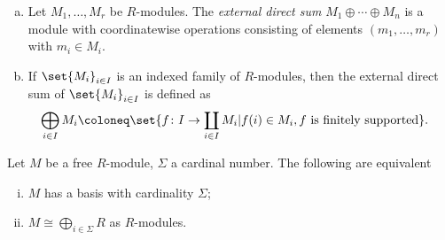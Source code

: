 \documentclass[10pt]{mypackage}
\begin{document}
\begin{definition}\hfill
  \begin{enumerate}[(a)]
    \item Let $M_1,\dots,M_r$ be $R$-modules. The \textit{external direct sum} $M_1\oplus\cdots\oplus M_n$ is a module with coordinatewise operations consisting of elements $\left( m_1,\dots,m_r \right)$ with $m_i\in M_i$.
    \item If $\set{M_i}_{i\in I}$ is an indexed family of $R$-modules, then the external direct sum of $\set{M_i}_{i\in I}$ is defined as
      \begin{align*}
        \bigoplus_{i\in I}M_i &\coloneq \set{f\colon I\rightarrow \coprod_{i\in I}M_i | f(i)\in M_i, f\text{ is finitely supported}}.
      \end{align*}
  \end{enumerate}
\end{definition}
\begin{theorem}
  Let $M$ be a free $R$-module, $\Sigma$ a cardinal number. The following are equivalent
  \begin{enumerate}[(i)]
    \item $M$ has a basis with cardinality $\Sigma$;
    \item $M\cong \bigoplus_{i\in \Sigma}R$ as $R$-modules.
  \end{enumerate}
\end{theorem}
\end{document}
